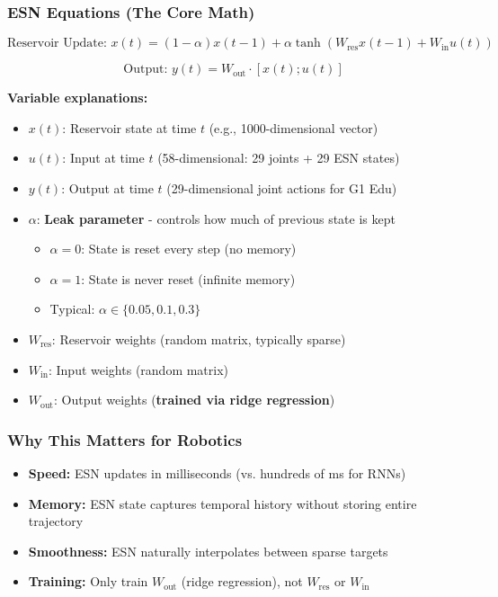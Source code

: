 \documentclass[11pt]{article}
\begin{document}
\subsubsection{ESN Equations (The Core Math)}
\begin{equation}
\text{Reservoir Update: } x(t) = (1-\alpha)x(t-1) + \alpha \tanh\left(W_{\text{res}}x(t-1) + W_{\text{in}}u(t)\right)
\end{equation}

\begin{equation}
\text{Output: } y(t) = W_{\text{out}} \cdot [x(t); u(t)]
\end{equation}

\textbf{Variable explanations:}
\begin{itemize}
    \item $x(t)$: Reservoir state at time $t$ (e.g., 1000-dimensional vector)
    \item $u(t)$: Input at time $t$ (58-dimensional: 29 joints + 29 ESN states)
    \item $y(t)$: Output at time $t$ (29-dimensional joint actions for G1 Edu)
    \item $\alpha$: \textbf{Leak parameter} - controls how much of previous state is kept
    \begin{itemize}
        \item $\alpha = 0$: State is reset every step (no memory)
        \item $\alpha = 1$: State is never reset (infinite memory)
        \item Typical: $\alpha \in \{0.05, 0.1, 0.3\}$
    \end{itemize}
    \item $W_{\text{res}}$: Reservoir weights (random matrix, typically sparse)
    \item $W_{\text{in}}$: Input weights (random matrix)
    \item $W_{\text{out}}$: Output weights (\textbf{trained via ridge regression})
\end{itemize}

\subsubsection{Why This Matters for Robotics}
\begin{itemize}
    \item \textbf{Speed:} ESN updates in milliseconds (vs. hundreds of ms for RNNs)
    \item \textbf{Memory:} ESN state captures temporal history without storing entire trajectory
    \item \textbf{Smoothness:} ESN naturally interpolates between sparse targets
    \item \textbf{Training:} Only train $W_{\text{out}}$ (ridge regression), not $W_{\text{res}}$ or $W_{\text{in}}$
\end{itemize}
\end{document}
